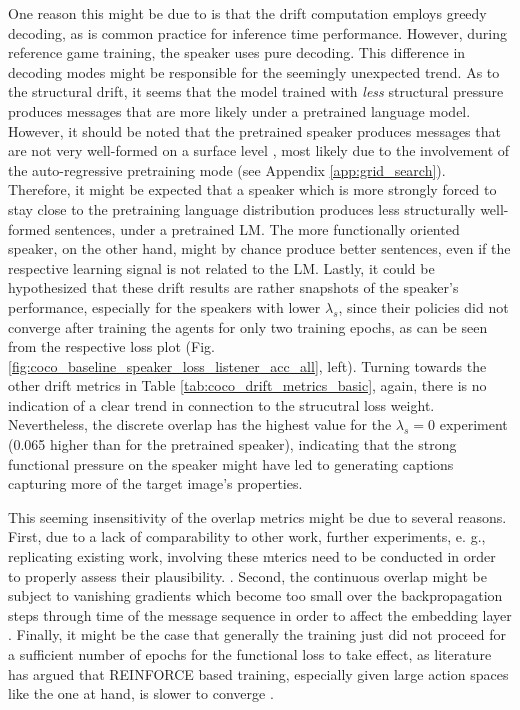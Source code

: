 One reason this might be due to is that the drift computation employs greedy decoding, as is common practice for inference time performance. However, during reference game training, the speaker uses pure decoding. This difference in decoding modes might be responsible for the seemingly unexpected trend. As to the structural drift, it seems that the model trained with \emph{less} structural pressure produces messages that are more likely under a pretrained language model. However, it should be noted that the pretrained speaker produces messages that are not very well-formed on a surface level , most likely due to the involvement of the auto-regressive pretraining mode (see Appendix \ref{app:grid_search}). Therefore, it might be expected that a speaker which is more strongly forced to stay close to the pretraining language distribution produces less structurally well-formed sentences, under a pretrained LM. The more functionally oriented speaker, on the other hand, might by chance produce better sentences, even if the respective learning signal is not related to the LM. Lastly, it could be hypothesized that these drift results are rather snapshots of the speaker's performance, especially for the speakers with lower $\lambda_s$, since their policies did not converge after training the agents for only two training epochs, as can be seen from the respective loss plot (Fig. \ref{fig:coco_baseline_speaker_loss_listener_acc_all}, left). 
Turning towards the other drift metrics in Table \ref{tab:coco_drift_metrics_basic}, again, there is no indication of a clear trend in connection to the strucutral loss weight. Nevertheless, the discrete overlap has the highest value for the $\lambda_s = 0$ experiment (0.065 higher than for the pretrained speaker), indicating that the strong functional pressure on the speaker might have led to generating captions capturing more of the target image's properties.

This seeming insensitivity of the overlap metrics might be due to several reasons. First, due to a lack of comparability to other work, further experiments, e. g., replicating existing work, involving these mterics need to be conducted in order to properly assess their plausibility. . Second, the continuous overlap might be subject to vanishing gradients which become too small over the backpropagation steps through time of the message sequence in order to affect the embedding layer \parencite[cf.][]{jaeger2002tutorial}. Finally, it might be the case that generally the training just did not proceed for a sufficient number of epochs for the functional loss to take effect, as literature has argued that REINFORCE based training, especially given large action spaces like the one at hand, is slower to converge \parencite{havrylov2017emergence} .

